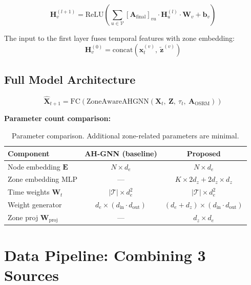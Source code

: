 \documentclass[12pt,a4paper]{article}
\begin{document}
\begin{equation}
\mathbf{H}^{(l+1)}_v = \text{ReLU}\!\left(
\sum_{u \in \mathcal{V}} [\mathbf{A}_{\text{final}}]_{vu} \cdot
\mathbf{H}^{(l)}_u \cdot \mathbf{W}_v + \mathbf{b}_v
\right)
\end{equation}

The input to the first layer fuses temporal features with zone embedding:
\begin{equation}
\mathbf{H}^{(0)}_v = \text{concat}\!\left(\mathbf{x}_t^{(v)},\ \tilde{\mathbf{z}}^{(v)}\right)
\end{equation}

\subsection{Full Model Architecture}

\begin{equation}
\hat{\mathbf{X}}_{t+1} = \text{FC}\!\left(
\text{ZoneAwareAHGNN}\!\left(\mathbf{X}_t,\ \mathbf{Z},\ \tau_t,\ \mathbf{A}_{\text{OSRM}}\right)
\right)
\end{equation}

\noindent\textbf{Parameter count comparison:}

\begin{table}[h]
\centering
\begin{tabular}{lcc}
\toprule
\textbf{Component} & \textbf{AH-GNN (baseline)} & \textbf{Proposed} \\
\midrule
Node embedding $\mathbf{E}$ & $N \times d_e$ & $N \times d_e$ \\
Zone embedding MLP & --- & $K \times 2d_z + 2d_z \times d_z$ \\
Time weights $\mathbf{W}_t$ & $|\mathcal{T}| \times d_e^2$ & $|\mathcal{T}| \times d_e^2$ \\
Weight generator & $d_e \times (d_{\text{in}} \cdot d_{\text{out}})$ & $(d_e+d_z) \times (d_{\text{in}} \cdot d_{\text{out}})$ \\
Zone proj $\mathbf{W}_{\text{proj}}$ & --- & $d_z \times d_e$ \\
\bottomrule
\end{tabular}
\caption{Parameter comparison. Additional zone-related parameters are minimal.}
\end{table}

\section{Data Pipeline: Combining 3 Sources}
\end{document}
